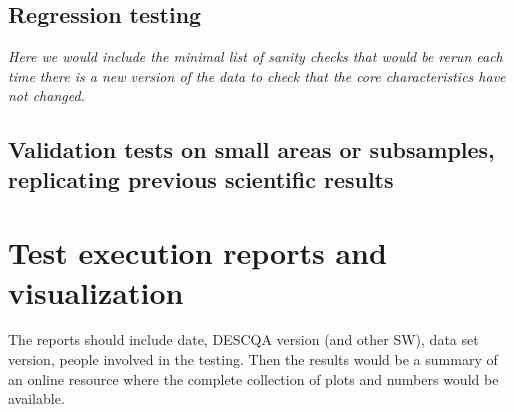 \documentclass[12pt, a4paper]{article}
\begin{document}
\subsection{Regression testing}

\textit{Here we would include the minimal list of sanity checks that would be rerun each time there is a new version of the data to check that the core characteristics have not changed.}

\subsection{Validation tests on small areas or subsamples, replicating previous scientific results}



\section{Test execution reports and visualization}

The reports should include date, DESCQA version (and other SW), data set version, people involved in the testing. Then the results would be a summary of an online resource where the complete collection of plots and numbers would be available.
\end{document}
